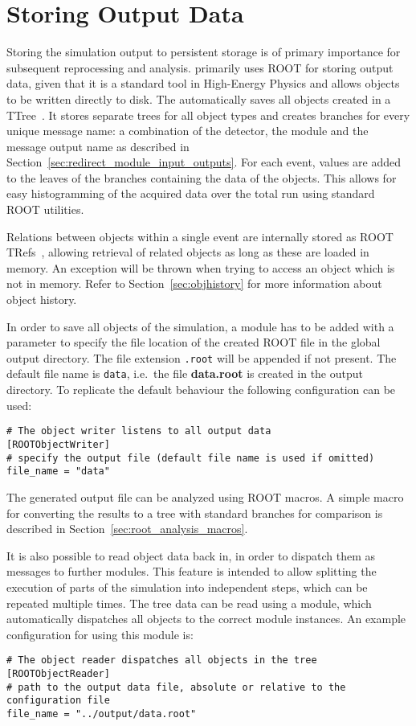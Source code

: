 \section{Storing Output Data}
\label{sec:storing_output_data}
Storing the simulation output to persistent storage is of primary importance for subsequent reprocessing and analysis.
\apsq primarily uses ROOT for storing output data, given that it is a standard tool in High-Energy Physics and allows objects to be written directly to disk.
The  automatically saves all objects created in a TTree~\cite{roottree}.
It stores separate trees for all object types and creates branches for every unique message name: a combination of the detector, the module and the message output name as described in Section~\ref{sec:redirect_module_input_outputs}.
For each event, values are added to the leaves of the branches containing the data of the objects.
This allows for easy histogramming of the acquired data over the total run using standard ROOT utilities.

Relations between objects within a single event are internally stored as ROOT TRefs~\cite{roottref}, allowing retrieval of related objects as long as these are loaded in memory.
An exception will be thrown when trying to access an object which is not in memory.
Refer to Section~\ref{sec:objhistory} for more information about object history.

In order to save all objects of the simulation, a  module has to be added with a  parameter to specify the file location of the created ROOT file in the global output directory.
The file extension \texttt{.root} will be appended if not present.
The default file name is \texttt{data}, i.e.\ the file \textbf{data.root} is created in the output directory.
To replicate the default behaviour the following configuration can be used:
\begin{verbatim}
# The object writer listens to all output data
[ROOTObjectWriter]
# specify the output file (default file name is used if omitted)
file_name = "data"
\end{verbatim}
The generated output file can be analyzed using ROOT macros.
A simple macro for converting the results to a tree with standard branches for comparison is described in Section~\ref{sec:root_analysis_macros}.

It is also possible to read object data back in, in order to dispatch them as messages to further modules.
This feature is intended to allow splitting the execution of parts of the simulation into independent steps, which can be repeated multiple times.
The tree data can be read using a  module, which automatically dispatches all objects to the correct module instances.
An example configuration for using this module is:
\begin{verbatim}
# The object reader dispatches all objects in the tree
[ROOTObjectReader]
# path to the output data file, absolute or relative to the configuration file
file_name = "../output/data.root"
\end{verbatim}

